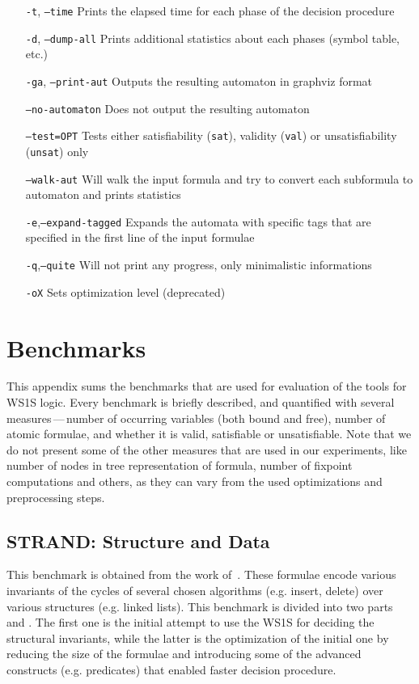 \begin{itemize}
	\item[\texttt{-t}, \texttt{--time}] Prints the elapsed time for each
		phase of the decision procedure
	\item[\texttt{-d}, \texttt{--dump-all}] Prints additional statistics
		about each phases (symbol table, etc.)
	\item[\texttt{-ga}, \texttt{--print-aut}] Outputs the resulting 
		automaton in graphviz format
	\item[\texttt{--no-automaton}] Does not output the resulting
		automaton
	\item[\texttt{--test=OPT}] Tests either satisfiability (\texttt{sat}),
		validity (\texttt{val}) or unsatisfiability (\texttt{unsat}) only
	\item[\texttt{--walk-aut}] Will walk the input formula and try to
		convert each subformula to automaton and prints statistics
	\item[\texttt{-e},\texttt{--expand-tagged}] Expands the automata
		with specific tags that are specified in the first line of
		the input formulae
	\item[\texttt{-q},\texttt{--quite}] Will not print any progress,
		only minimalistic informations
	\item[\texttt{-oX}] Sets optimization level (deprecated)
\end{itemize}

\chapter{Benchmarks}

This appendix sums the benchmarks that are used for evaluation of the tools for WS1S logic.
Every benchmark is briefly described, and quantified with several measures\,---\,number
of occurring variables (both bound and free), number of atomic formulae, and whether it is
valid, satisfiable or unsatisfiable. Note that we do not present some of the other measures
that are used in our experiments, like number of nodes in tree representation of formula, 
number of fixpoint computations and others, as they can vary from the used optimizations
and preprocessing steps.

\section{STRAND: Structure and Data}

This benchmark is obtained from the work of~\cite{strand1, strand2}. These formulae encode
various invariants of the cycles of several chosen algorithms (e.g. insert, delete) over 
various structures (e.g. linked lists). This benchmark is divided into two parts
\strandbenchone and \strandbenchtwo. The first one is the initial attempt to use the
WS1S for deciding the structural invariants, while the latter is the optimization of the 
initial one by reducing the size of the formulae and introducing some of the advanced 
constructs (e.g. predicates) that enabled faster decision procedure.

